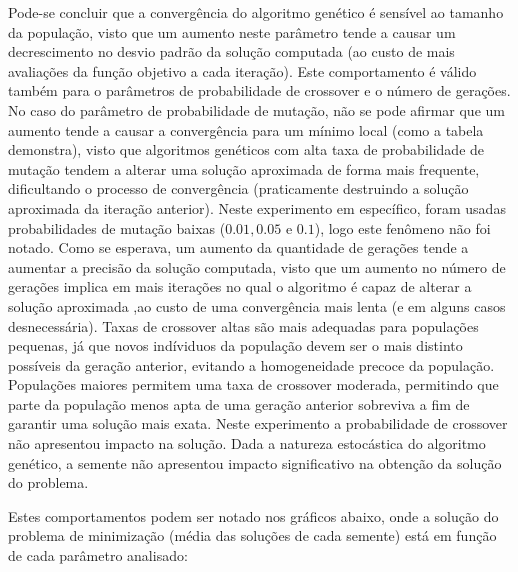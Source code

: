 \documentclass[a4paper, 11pt]{article}
\begin{document}
Pode-se concluir que a convergência do algoritmo genético é sensível ao tamanho da população, visto que um aumento neste parâmetro tende a causar um decrescimento no desvio padrão da solução computada (ao custo de mais avaliações da função objetivo a cada iteração). Este comportamento é válido também para o parâmetros de probabilidade de crossover e o número de gerações. \newline
No caso do parâmetro de probabilidade de mutação, não se pode afirmar que um aumento tende a causar a convergência para um mínimo local (como a tabela demonstra), visto que algoritmos genéticos com alta taxa de probabilidade de mutação tendem a alterar uma solução aproximada de forma mais frequente, dificultando o processo de convergência (praticamente destruindo a solução aproximada da iteração anterior). Neste experimento em específico, foram usadas probabilidades de mutação baixas ($0.01, 0.05$ e $0.1$), logo este fenômeno não foi notado. \newline
Como se esperava, um aumento da quantidade de gerações tende a aumentar a precisão da solução computada, visto que um aumento no número de gerações implica em mais iterações no qual o algoritmo é capaz de alterar a solução aproximada ,ao custo de uma convergência mais lenta (e em alguns casos desnecessária). \newline
Taxas de crossover altas são mais adequadas para populações pequenas, já que novos indíviduos da população devem ser o mais distinto possíveis da geração anterior, evitando a homogeneidade precoce da população. Populações maiores permitem uma taxa de crossover moderada, permitindo que parte da população menos apta de uma geração anterior sobreviva a fim de garantir uma solução mais exata. Neste experimento a probabilidade de crossover não apresentou impacto na solução. \newline
Dada a natureza estocástica do algoritmo genético, a semente não apresentou impacto significativo na obtenção da solução do problema.\newline


Estes comportamentos podem ser notado nos gráficos abaixo, onde a solução do problema de minimização (média das soluções de cada semente) está em função de cada parâmetro analisado:
\end{document}
